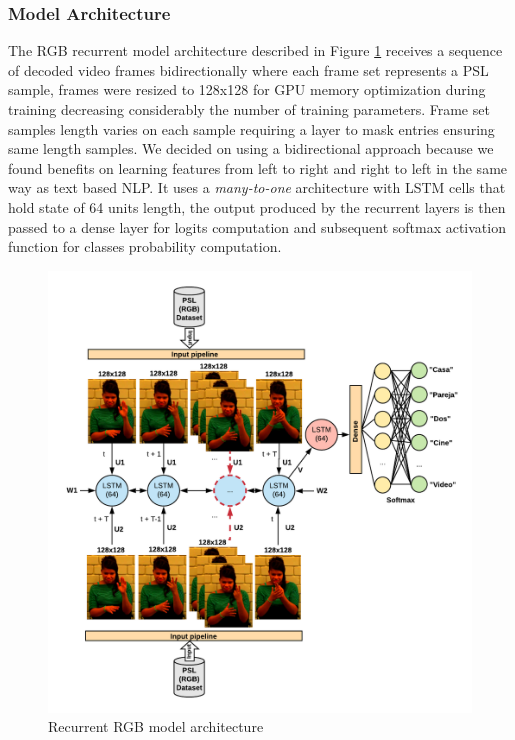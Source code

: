 \documentclass[twocolumn,conference]{article}
\begin{document}
\subsubsection{Model Architecture}\label{rgbrecurrentmodel-architecture}
The RGB recurrent model architecture described in Figure \ref{fig:rgb-architecture} receives a sequence of decoded video frames bidirectionally where each frame set represents a PSL sample, frames were resized to 128x128 for GPU memory optimization during training decreasing considerably the number of training parameters. Frame set samples length varies on each sample requiring a layer to mask entries ensuring same length samples.  We decided on using a bidirectional approach because we found benefits on learning features from left to right and right to left in the same way as text based NLP. It uses a \textit{many-to-one} architecture with LSTM cells that hold state of 64 units length, the output produced by the recurrent layers is then passed to a dense layer for logits computation and subsequent softmax activation function for classes probability computation.

\begin{figure}[hbt!]
\centering
\includegraphics[scale=0.8]{images/recurrent-rgb-model-architecture.png}
\caption{Recurrent RGB model architecture}
\label{fig:rgb-architecture}
\end{figure}
\end{document}
